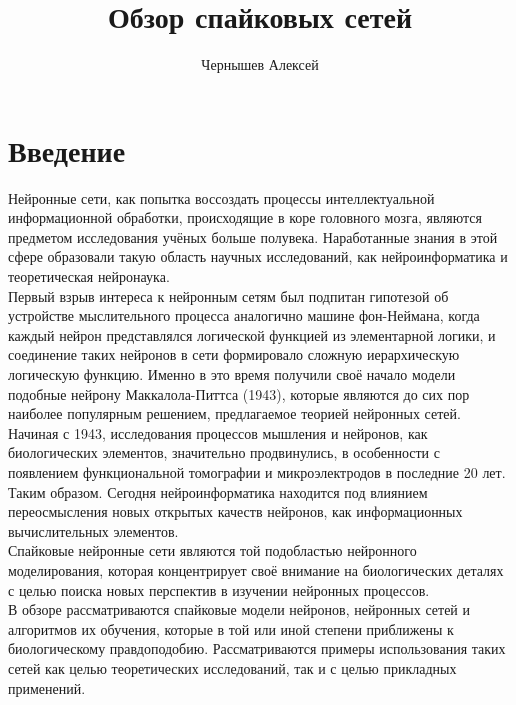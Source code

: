 \documentclass[a4paper,10pt]{article}
\title{Обзор спайковых сетей}
\author{Чернышев Алексей}
\begin{document}


\tableofcontents
\clearpage
\section{Введение}
\indent Нейронные сети, как попытка воссоздать процессы интеллектуальной информационной обработки, происходящие в коре головного мозга, являются предметом исследования учёных больше полувека. Наработанные знания в этой сфере образовали такую область научных исследований, как нейроинформатика и теоретическая нейронаука.\\
\indent Первый взрыв интереса к нейронным сетям был подпитан гипотезой об устройстве мыслительного процесса аналогично машине фон-Неймана, когда каждый нейрон представлялся логической функцией из элементарной логики, и соединение таких нейронов в сети формировало сложную иерархическую логическую функцию. Именно в это время получили своё начало модели подобные нейрону Маккалола-Питтса (1943), которые являются до сих пор наиболее популярным решением, предлагаемое теорией нейронных сетей.\\
\indent Начиная с 1943, исследования процессов мышления и нейронов, как биологических элементов, значительно продвинулись, в особенности с появлением функциональной томографии и микроэлектродов в последние 20 лет. Таким образом. Сегодня нейроинформатика находится под влиянием переосмысления новых открытых качеств нейронов\cite{BohteReview}, как информационных вычислительных элементов.\\
\indent Спайковые нейронные сети являются той подобластью нейронного моделирования, которая концентрирует своё внимание на биологических деталях с целью поиска новых перспектив в изучении нейронных процессов.\\
\indent В обзоре рассматриваются спайковые модели нейронов, нейронных сетей и алгоритмов их обучения, которые в той или иной степени приближены к биологическому правдоподобию. Рассматриваются примеры использования таких сетей как целью теоретических исследований, так и с целью прикладных применений.\\
\end{document}
